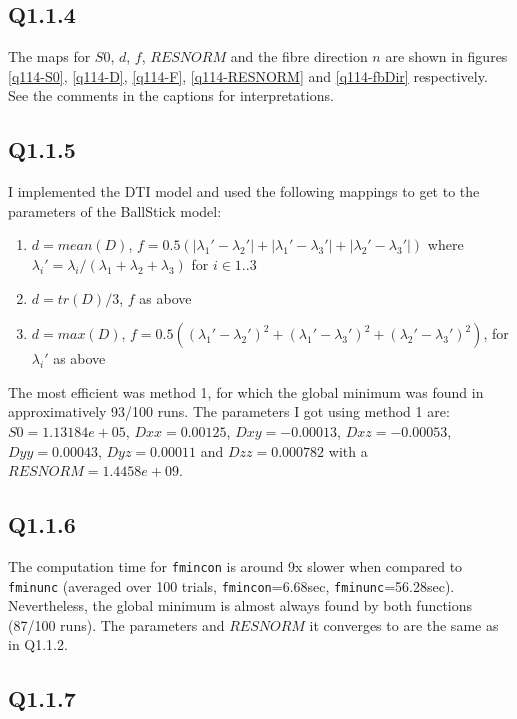 \documentclass[11pt,a4paper,oneside]{report}
\begin{document}
\subsection*{Q1.1.4}

The maps for $S0$, $d$, $f$, $RESNORM$ and the fibre direction $n$ are shown in figures \ref{q114-S0}, \ref{q114-D}, \ref{q114-F}, \ref{q114-RESNORM} and \ref{q114-fbDir} respectively. See the comments in the captions for interpretations.

\subsection*{Q1.1.5}

I implemented the DTI model and used the following mappings to get to the parameters of the BallStick model:
\begin{enumerate}
 \item $d = mean(D)$, $f = 0.5 ( |\lambda_1'- \lambda_2'| + |\lambda_1'- \lambda_3'| + |\lambda_2'- \lambda_3'|) $ where $\lambda_i' = \lambda_i/(\lambda_1 + \lambda_2 + \lambda_3)$ for $i \in 1..3$
 \item $d = tr(D)/3$, $f$ as above
 \item $d = max(D)$,  $f = 0.5 ( (\lambda_1'- \lambda_2')^2 + (\lambda_1'- \lambda_3')^2 + (\lambda_2'- \lambda_3')^2) $, for $\lambda_i'$ as above
\end{enumerate}

The most efficient was method 1, for which the global minimum was found in approximatively 93/100 runs. The parameters I got using method 1 are:$S0=1.13184e+05$, $Dxx=0.00125$, $Dxy=-0.00013$, $Dxz=-0.00053$, $Dyy=0.00043$, $Dyz=0.00011$ and $Dzz=0.000782$ with a $RESNORM=1.4458e+09$.



\subsection*{Q1.1.6}

The computation time for \texttt{fmincon} is around 9x slower when compared to \texttt{fminunc} (averaged over 100 trials, \texttt{fmincon}=6.68sec, \texttt{fminunc}=56.28sec). Nevertheless, the global minimum is almost always found by both functions (87/100 runs). The parameters and $RESNORM$ it converges to are the same as in Q1.1.2.

\subsection*{Q1.1.7}
\end{document}
